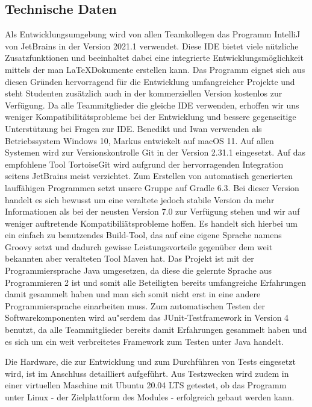 \newpage

\subsection{Technische Daten}\label{subsec:technische-daten}
Als Entwicklungsumgebung wird von allen Teamkollegen das Programm IntelliJ von JetBrains in der Version 2021.1 verwendet.
Diese IDE bietet viele n\"utzliche Zusatzfunktionen und beeinhaltet dabei eine integrierte Entwicklungsm\"oglichkeit mittels der man \LaTeX Dokumente erstellen kann.
Das Programm eignet sich aus diesen Gr\"unden hervorragend f\"ur die Entwicklung umfangreicher Projekte und steht Studenten zus\"atzlich auch in der kommerziellen Version kostenlos zur Verf\"ugung.
Da alle Teammitglieder die gleiche IDE verwenden, erhoffen wir uns weniger Kompatibilit\"atsprobleme bei der Entwicklung und bessere gegenseitige Unterst\"utzung bei Fragen zur IDE.
Benedikt und Iwan verwenden als Betriebssystem Windows 10, Markus entwickelt auf macOS 11.
Auf allen Systemen wird zur Versionskontrolle Git in der Version 2.31.1 eingesetzt.
Auf das empfohlene Tool TortoiseGit wird aufgrund der hervorragenden Integration seitens JetBrains meist verzichtet.
Zum Erstellen von automatisch generierten lauff\"ahigen Programmen setzt unsere Gruppe auf Gradle 6.3.
Bei dieser Version handelt es sich bewusst um eine veraltete jedoch stabile Version da mehr Informationen als bei der neusten Version 7.0 zur Verf\"ugung stehen und wir auf weniger auftretende Kompatibili\"atsprobleme hoffen.
Es handelt sich hierbei um ein einfach zu benutzendes Build-Tool, das auf eine eigene Sprache namens Groovy setzt und dadurch gewisse Leistungsvorteile gegen\"uber dem weit bekannten aber veralteten Tool Maven hat.
Das Projekt ist mit der Programmiersprache Java umgesetzen, da diese die gelernte Sprache aus Programmieren 2 ist und somit alle Beteiligten bereits umfangreiche Erfahrungen damit gesammelt haben und man sich somit nicht erst in eine andere Programmiersprache einarbeiten muss.
Zum automatischen Testen der Softwarekomponenten wird au"serdem das JUnit-Testframework in Version 4 benutzt, da alle Teammitglieder bereits damit Erfahrungen gesammelt haben und es sich um ein weit verbreitetes Framework zum Testen unter Java handelt.

Die Hardware, die zur Entwicklung und zum Durchf\"uhren von Tests eingesetzt wird, ist im Anschluss detailliert aufgef\"uhrt.
Aus Testzwecken wird zudem in einer virtuellen Maschine mit Ubuntu 20.04 LTS getestet, ob das Programm unter Linux - der Zielplattform des Modules - erfolgreich gebaut werden kann.

